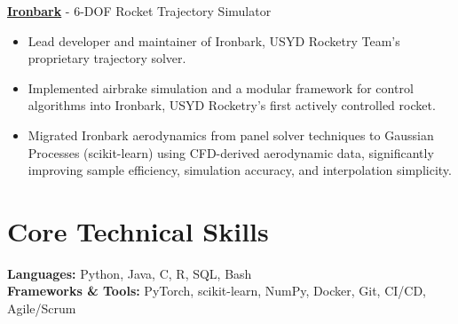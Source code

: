 \documentclass[10pt, letterpaper]{article}
\begin{document}
\href{https://rocketry-eng.sydney.edu.au/ironbark/}{\textbf{Ironbark}} - 6-DOF Rocket Trajectory Simulator
\begin{itemize}
    \item Lead developer and maintainer of Ironbark, USYD Rocketry Team's proprietary trajectory solver.
    \item Implemented airbrake simulation and a modular framework for control algorithms into Ironbark, USYD Rocketry's first actively controlled rocket.
    \item Migrated Ironbark aerodynamics from panel solver techniques to Gaussian Processes (scikit-learn) using CFD-derived aerodynamic data, significantly improving sample efficiency, simulation accuracy, and interpolation simplicity.
\end{itemize}

\section*{Core Technical Skills}
\textbf{Languages:} Python, Java, C, R, SQL, Bash \\
\textbf{Frameworks \& Tools:} PyTorch, scikit-learn, NumPy, Docker, Git, CI/CD, Agile/Scrum
\end{document}
